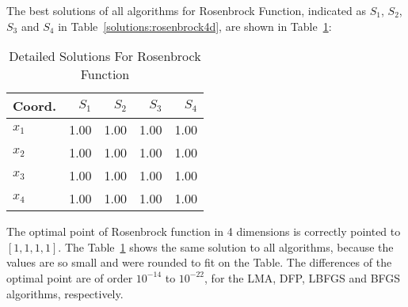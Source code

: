 
The best solutions of all algorithms for Rosenbrock Function, indicated as
$S_{1}$, $S_{2}$, $S_{3}$ and $S_{4}$ in Table~\ref{solutions:rosenbrock4d}, are shown
in Table~\ref{detailedsolutions:rosenbrock4d}:

\begin{table}[H]
\centering
\caption{Detailed Solutions For Rosenbrock Function}
\label{detailedsolutions:rosenbrock4d}
\begin{tabular}{lrrrr}
\toprule
 Coord. &  $S_{1}$ &  $S_{2}$ &  $S_{3}$ &  $S_{4}$ \\
\midrule
$x_{1}$ &     1.00 &     1.00 &     1.00 &     1.00 \\
$x_{2}$ &     1.00 &     1.00 &     1.00 &     1.00 \\
$x_{3}$ &     1.00 &     1.00 &     1.00 &     1.00 \\
$x_{4}$ &     1.00 &     1.00 &     1.00 &     1.00 \\
\bottomrule
\end{tabular}
\end{table}

The optimal point of Rosenbrock function in 4 dimensions is correctly pointed to $\left[1, 1, 1, 1\right]$. The Table~\ref{detailedsolutions:rosenbrock4d}
shows the same solution to all algorithms, because the values are so small and were rounded to fit on the Table. The differences of
the optimal point are of order $10^{-14}$ to $10^{-22}$, for the LMA, DFP, LBFGS and BFGS algorithms, respectively.